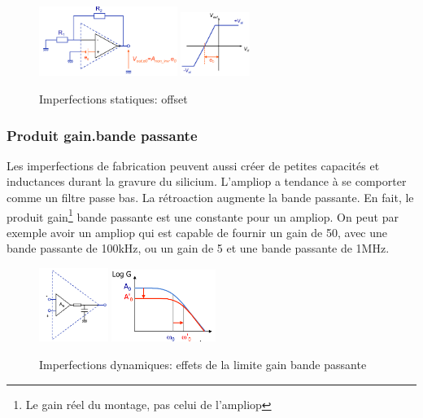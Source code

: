 \documentclass[a4paper]{article}
\begin{document}
    \begin{figure}[H]
        \begin{center}
            \includegraphics[width=0.4\textwidth]{fig/4_offset.png}
            \includegraphics[width=0.2\textwidth]{fig/4_offsetgraph.png}
            \caption{Imperfections statiques: offset}
            \label{fig:4_offset}
        \end{center}
    \end{figure}

    \subsubsection{Produit gain.bande passante}
    Les imperfections de fabrication peuvent aussi créer de petites capacités
    et inductances durant la gravure du silicium. L'ampliop a tendance à se comporter
    comme un filtre passe bas. La rétroaction augmente la bande passante. En fait, 
    le produit gain\footnote{Le gain réel du montage, pas celui de l'ampliop} bande passante est une constante pour un ampliop.
    On peut par exemple avoir un ampliop qui est capable de fournir un gain de 50, 
    avec une bande passante de 100kHz, ou un gain de 5 et une bande passante de 1MHz.

    \begin{figure}[H]
        \begin{center}
            \includegraphics[width=0.2\textwidth]{fig/4_gainbw.png}
            \includegraphics[width=0.3\textwidth]{fig/4_gainbwgraph.png}
            \caption{Imperfections dynamiques: effets de la limite gain bande passante}
            \label{fig:4_gainbw}
        \end{center}
    \end{figure}
\end{document}
